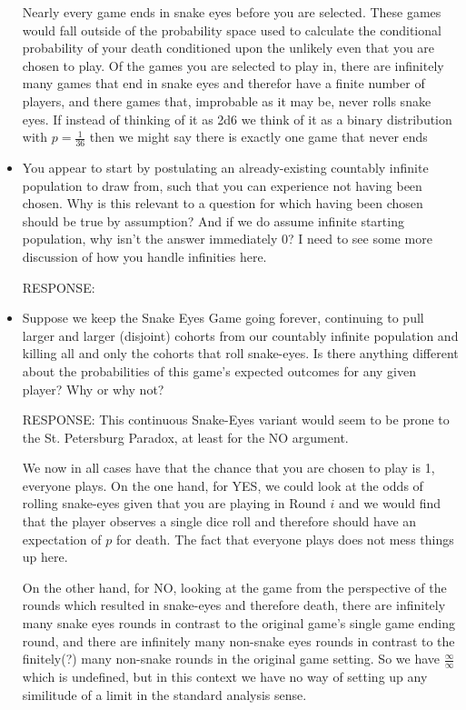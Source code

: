 \documentclass[article,twocolumn]{memoir}
\begin{document}
\begin{itemize}
{        Nearly every game ends in snake eyes before you are selected.  These games would fall outside of the probability space used to calculate the conditional probability of your death conditioned upon the unlikely even that you are chosen to play.   Of the games you are selected to play in, there are infinitely many games that end in snake eyes and therefor have a finite number of players, and there  games that, improbable as it may be, never rolls snake eyes.  If instead of thinking of it as 2d6 we think of it as a binary distribution with $p=\frac{1}{36}$ then we might say there is exactly one game that never ends
    }
\item You appear to start by postulating an already-existing countably infinite population to draw from, such that you can experience not having been chosen. Why is this relevant to a question for which having been chosen should be true by assumption? And if we do assume infinite starting population, why isn’t the answer immediately 0? I need to see some more discussion of how you handle infinities here.

    {\color{red}
        RESPONSE: 
        
    }
\item Suppose we keep the Snake Eyes Game going forever, continuing to pull larger and larger (disjoint) cohorts from our countably infinite population and killing all and only the cohorts that roll snake-eyes. Is there anything different about the probabilities of this game’s expected outcomes for any given player? Why or why not?

    {\color{red}
        RESPONSE: 
        This continuous Snake-Eyes variant would seem to be prone to the St. Petersburg Paradox, at least for the NO argument.  

        We now in all cases have that the chance that you are chosen to play is 1, everyone plays.  On the one hand, for YES, we could look at the odds of rolling snake-eyes given that you are playing in Round $i$ and we would find that the player observes a single dice roll and therefore should have an expectation of $p$ for death.  The fact that everyone plays does not mess things up here.

        On the other hand, for NO, looking at the game from the perspective of the rounds which resulted in snake-eyes and therefore death, there are infinitely many snake eyes rounds in contrast to the original game's single game ending round, and there are infinitely many non-snake eyes rounds in contrast to the finitely(?) many non-snake rounds in the original game setting.  So we have $\frac{\infty}{\infty}$ which is undefined, but in this context we have no way of setting up any similitude of a limit in the standard analysis sense.

}
\end{itemize}
\end{document}
